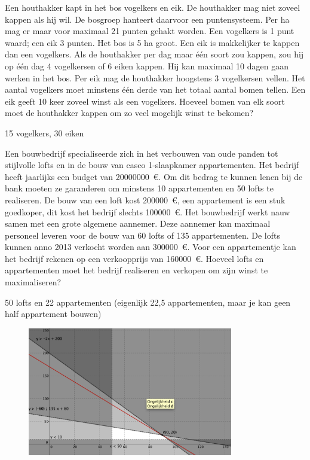 \begin{oef}
Een houthakker kapt in het bos vogelkers en eik. 
De houthakker mag niet zoveel kappen als hij wil. De bosgroep hanteert
daarvoor een puntensysteem. Per ha mag er maar voor maximaal 21 punten
gehakt worden. Een vogelkers is 1 punt waard; een eik 3 punten.
Het bos is 5 ha groot.
Een eik is makkelijker te kappen dan een vogelkers. Als de houthakker per dag maar 
\'e\'en soort zou kappen, zou hij op \'e\'en dag 4 vogelkersen of 6 eiken kappen. 
Hij kan maximaal 10 dagen gaan werken in het bos.
Per eik mag de houthakker hoogstens 3 vogelkersen vellen.
Het aantal vogelkers moet minstens \'e\'en derde van het totaal aantal bomen
tellen.
Een eik geeft 10 keer zoveel winst als een vogelkers. Hoeveel bomen van elk soort
moet de houthakker kappen om zo veel mogelijk winst te bekomen? 
\begin{opl}
15 vogelkers, 30 eiken
\end{opl}
\end{oef}

\begin{oef}    
Een bouwbedrijf specialiseerde zich in het verbouwen van oude panden tot stijlvolle lofts en in de bouw van casco 1-slaapkamer appartementen. Het bedrijf heeft jaarlijks een budget van \SI{20000000}{\euro}. Om dit bedrag te kunnen lenen bij de bank moeten ze garanderen om minstens 10 appartementen en 50 lofts te realiseren. De bouw van een loft kost \SI{200000}{\euro}, een appartement is een stuk goedkoper, dit kost het bedrijf slechts \SI{100000}{\euro}. Het bouwbedrijf werkt nauw samen met een grote algemene aannemer. Deze aannemer kan maximaal personeel leveren voor de bouw van 60 lofts of 135 appartementen. De lofts kunnen anno 2013 verkocht worden aan \SI{300000}{\euro}. Voor een appartementje kan het bedrijf rekenen op een verkoopprijs van \SI{160000}{\euro}. Hoeveel lofts en appartementen moet het bedrijf realiseren en verkopen om zijn winst te maximaliseren?
\begin{opl}
50 lofts en 22 appartementen (eigenlijk 22,5 appartementen, maar je kan geen half appartement bouwen)
\begin{figure}[htb]
\centering
\includegraphics[width=0.8\textwidth]{oefeningen/FigurenLP/lofts}
\end{figure}
\end{opl}
\end{oef}




